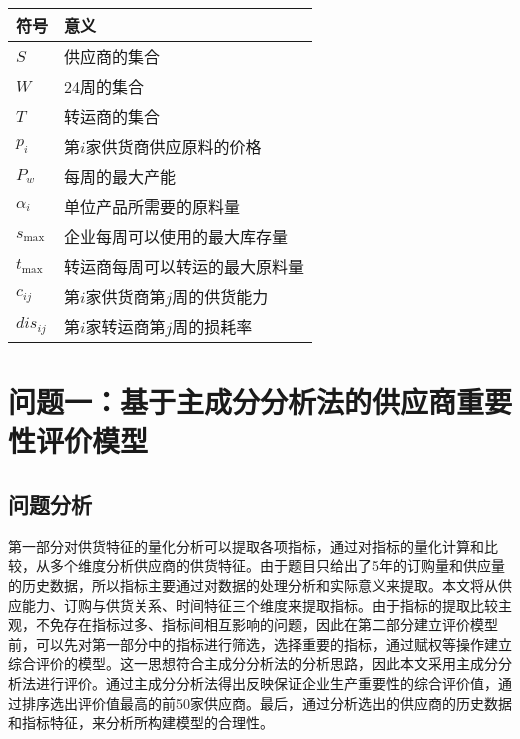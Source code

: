 \documentclass[withoutpreface,bwprint]{cumcmthesis} %
\begin{document}
\begin{table}[h]
    \centering
    \begin{tabular}{p{4cm}<{\centering}p{10cm}<{\centering}}
    \toprule[1.5pt]
    符号 & 意义\\ %
    \toprule[1pt]
    $S$ & 供应商的集合\\
    $W$ & 24周的集合\\
    $T$ & 转运商的集合\\
    $p_i$ & 第$i$家供货商供应原料的价格\\
    $P_w$ & 每周的最大产能\\
    $\alpha_{i}$ & 单位产品所需要的原料量\\
    $s_{\max}$ & 企业每周可以使用的最大库存量\\
    $t_{\max}$ & 转运商每周可以转运的最大原料量\\
    $c_{ij}$ & 第$i$家供货商第$j$周的供货能力\\
    $dis_{ij}$ & 第$i$家转运商第$j$周的损耗率\\
    \toprule[1.5pt]
    \end{tabular}
\end{table}



\section{问题一：基于主成分分析法的供应商重要性评价模型}

\subsection{问题分析}
第一部分对供货特征的量化分析可以提取各项指标，通过对指标的量化计算和比较，从多个维度分析供应商的供货特征。由于题目只给出了5年的订购量和供应量的历史数据，所以指标主要通过对数据的处理分析和实际意义来提取。本文将从供应能力、订购与供货关系、时间特征三个维度来提取指标。由于指标的提取比较主观，不免存在指标过多、指标间相互影响的问题，因此在第二部分建立评价模型前，可以先对第一部分中的指标进行筛选，选择重要的指标，通过赋权等操作建立综合评价的模型。这一思想符合主成分分析法的分析思路，因此本文采用主成分分析法进行评价。通过主成分分析法得出反映保证企业生产重要性的综合评价值，通过排序选出评价值最高的前50家供应商。最后，通过分析选出的供应商的历史数据和指标特征，来分析所构建模型的合理性。
\end{document}
